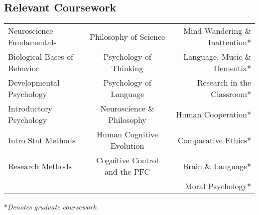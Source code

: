\documentclass[10pt,a4paper]{cv_public}
\begin{document}
\vspace{7.5pt}
\subsection{Relevant Coursework}
\begin{tabular}{l c r}
Neuroscience Fundamentals & Philosophy of Science & Mind Wandering \& Inattention*\\  
Biological Bases of Behavior & Psychology of Thinking & Language, Music \& Dementia*\\ 
Developmental Psychology & Psychology of Language & Research in the Classroom*\\
Introductory Psychology & Neuroscience \& Philosophy & Human Cooperation* \\
Intro Stat Methods & Human Cognitive Evolution & Comparative Ethics*\\
Research Methods & Cognitive Control and the PFC & Brain \& Language*\\
& & Moral Psychology*\\
\end{tabular}

\vspace{2.5pt}
\raggedright{*\textit{Denotes graduate coursework.}}
\vspace{5pt}


\end{document}
